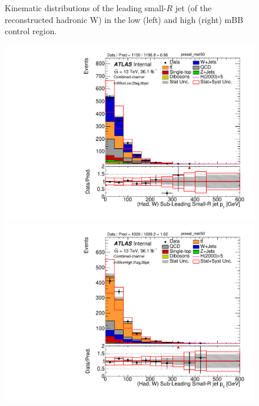\begin{figure}[!ht]
\begin{center}
\caption{Kinematic distributions of the leading small-$R$ jet (of the reconstructed hadronic W) in the low (left) and high (right) mBB control region.}
\label{fig:boosted_mbbcrHighLow_whad_leadjet}
\end{center}
\end{figure}


\begin{figure}[!ht]
\begin{center}
\includegraphics[scale=0.33]{./figures/boosted/PlotByMbbRegions/DataMC_2tag_0bjet_mbbcrLow_lepton_presel_met50_LightJet2Pt}                                                                         
\includegraphics[scale=0.33]{./figures/boosted/PlotByMbbRegions/DataMC_2tag_0bjet_mbbcrHigh_lepton_presel_met50_LightJet2Pt}                                                                        

\end{center}
\end{figure}

